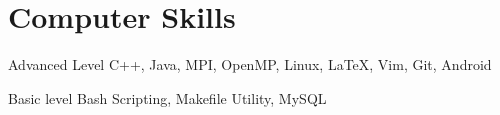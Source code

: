 \documentclass{tccv}
\begin{document}
\section{Computer Skills}

\begin{factlist}

\item{Advanced Level}
     {C++, Java, MPI, OpenMP, Linux, \LaTeX, Vim, Git, Android}


\item{Basic level}
     {Bash Scripting, Makefile Utility, MySQL}

\end{factlist}
\end{document}
